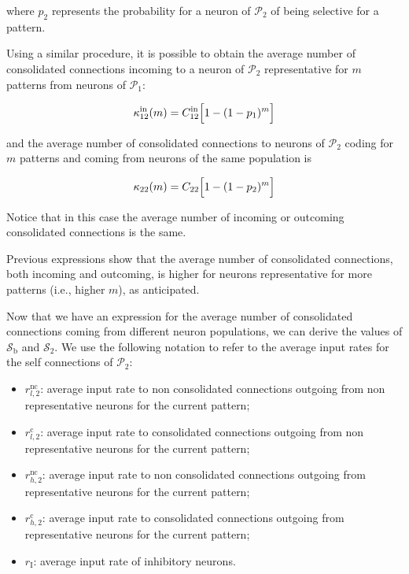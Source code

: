 \documentclass[a4paper, 12pt, twoside, openright]{book}
\newcommand{\popI}{\mathcal{P}_1}
\newcommand{\popII}{\mathcal{P}_2}
\newcommand{\SII}{\mathcal{S}_\text{2}}
\newcommand{\Sb}{\mathcal{S}_\text{b}}
\begin{document}
where $p_2$ represents the probability for a neuron of $\popII$ of being selective for a pattern.


Using a similar procedure, it is possible to obtain the average number of consolidated connections incoming to a neuron of $\popII$ representative for $m$ patterns from neurons of $\popI$:

\begin{equation}
\label{eq:kin_m}
    \kappa_{12}^\text{in} (m)=C_{12}^\text{in} \Bigl[ 1- (1-p_1)^m\Bigr]
\end{equation}

and the average number of consolidated connections to neurons of $\popII$ coding for $m$ patterns and coming from neurons of the same population is

\begin{equation}
\label{eq:k22_m}
    \kappa_{22} (m)=C_{22} \Bigl[ 1- (1-p_2)^m\Bigr]
\end{equation}

Notice that in this case the average number of incoming or outcoming consolidated connections is the same.

Previous expressions show that the average number of consolidated connections, both incoming and outcoming, is higher for neurons representative for more patterns (i.e., higher $m$), as anticipated.


Now that we have an expression for the average number of consolidated connections coming from different neuron populations, we can derive the values of $\Sb$ and $\SII$. We use the following notation to refer to the average input rates for the self connections of $\popII$:

\begin{itemize}
    \item $r_{l,2}^{\text{nc}}$: average input rate to non consolidated connections outgoing from non representative neurons for the current pattern;
    \item $r_{l,2}^{\text{c}}$: average input rate to consolidated connections outgoing from non representative neurons for the current pattern;
    \item $r_{h,2}^{\text{nc}}$: average input rate to non consolidated connections outgoing from representative neurons for the current pattern;
    \item $r_{h,2}^{\text{c}}$: average input rate to consolidated connections outgoing from representative neurons for the current pattern;
    \item $r_\text{I}$: average input rate of inhibitory neurons.
\end{itemize}
\end{document}
